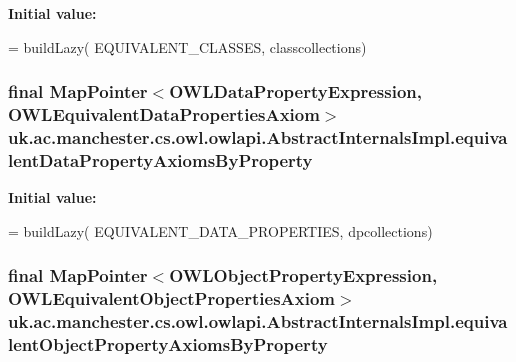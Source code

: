 {\bfseries Initial value\-:}
\begin{DoxyCode}
= buildLazy(
            EQUIVALENT\_CLASSES, classcollections)
\end{DoxyCode}
\hypertarget{classuk_1_1ac_1_1manchester_1_1cs_1_1owl_1_1owlapi_1_1_abstract_internals_impl_a604653413528dc036f988b6d3e603bc7}{
\subsubsection[{equivalent\-Data\-Property\-Axioms\-By\-Property}]{\setlength{\rightskip}{0pt plus 5cm}final Map\-Pointer$<${\bf O\-W\-L\-Data\-Property\-Expression}, {\bf O\-W\-L\-Equivalent\-Data\-Properties\-Axiom}$>$ uk.\-ac.\-manchester.\-cs.\-owl.\-owlapi.\-Abstract\-Internals\-Impl.\-equivalent\-Data\-Property\-Axioms\-By\-Property\hspace{0.3cm}{\ttfamily [protected]}}}\label{classuk_1_1ac_1_1manchester_1_1cs_1_1owl_1_1owlapi_1_1_abstract_internals_impl_a604653413528dc036f988b6d3e603bc7}
{\bfseries Initial value\-:}
\begin{DoxyCode}
= buildLazy(
            EQUIVALENT\_DATA\_PROPERTIES, dpcollections)
\end{DoxyCode}
\hypertarget{classuk_1_1ac_1_1manchester_1_1cs_1_1owl_1_1owlapi_1_1_abstract_internals_impl_a1e27d391cbe6dc5af1ab1e3ab88f4e8d}{
\subsubsection[{equivalent\-Object\-Property\-Axioms\-By\-Property}]{\setlength{\rightskip}{0pt plus 5cm}final Map\-Pointer$<${\bf O\-W\-L\-Object\-Property\-Expression}, {\bf O\-W\-L\-Equivalent\-Object\-Properties\-Axiom}$>$ uk.\-ac.\-manchester.\-cs.\-owl.\-owlapi.\-Abstract\-Internals\-Impl.\-equivalent\-Object\-Property\-Axioms\-By\-Property\hspace{0.3cm}{\ttfamily [protected]}}}\label{classuk_1_1ac_1_1manchester_1_1cs_1_1owl_1_1owlapi_1_1_abstract_internals_impl_a1e27d391cbe6dc5af1ab1e3ab88f4e8d}
